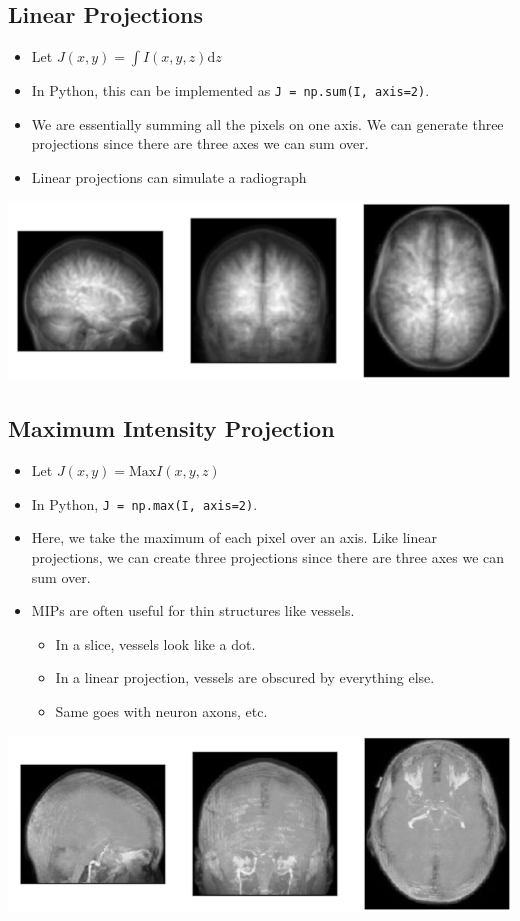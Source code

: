 \documentclass[10pt]{article}
\begin{document}
\subsection*{Linear Projections}
\begin{itemize}
    \item Let $J(x, y) = \int I(x, y, z) \text{d}z$
    \item In Python, this can be implemented as \texttt{J = np.sum(I, axis=2)}.
    \item We are essentially summing all the pixels on one axis.  We can generate three projections since there are three axes we can sum over.
    \item Linear projections can simulate a radiograph
\end{itemize}
\begin{center}
    \includegraphics*[width=\textwidth]{W1_13.png}
\end{center}
\subsection*{Maximum Intensity Projection}
\begin{itemize}
    \item Let $J(x, y) = \text{Max} I(x, y, z)$
    \item In Python, \texttt{J = np.max(I, axis=2)}.
    \item Here, we take the maximum of each pixel over an axis.  Like linear projections, we can create three projections since there are three axes we can sum over.
    \item MIPs are often useful for thin structures like vessels.
    \begin{itemize}
        \item In a slice, vessels look like a dot.
        \item In a linear projection, vessels are obscured by everything else.
        \item Same goes with neuron axons, etc.
    \end{itemize}
\end{itemize}
\begin{center}
    \includegraphics*[width=\textwidth]{W1_14.png}
\end{center}
\end{document}
